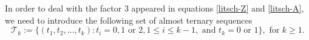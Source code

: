 \documentclass[11pt,reqno]{amsart}
\numberwithin{equation}{section}
\theoremstyle{plain}
\theoremstyle{definition}
\newtheorem{example}[theorem]{Example}
\newcommand{\T}{\mathcal{T}}
\begin{document}



In order to deal with the factor $3$ appeared in equations \eqref{litsch-Z} and \eqref{litsch-A}, we need to introduce the following set of almost ternary sequences
$$
\T_k:=\{(t_1,t_2,\ldots,t_k):\text{$t_i=0,1$ or $2$}, 1\le i\le k-1, \text{ and } \text{$t_k=0$ or $1$} \}, \text{ for } k\ge 1.
$$
\end{document}
